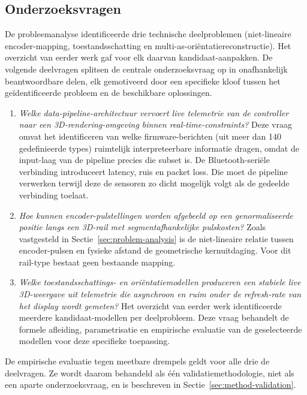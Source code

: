 \documentclass[10pt, a4paper, twocolumn]{article}
\begin{document}
\subsection{Onderzoeksvragen}
\label{sec:research-questions}
De probleemanalyse identificeerde drie technische deelproblemen (niet-lineaire
encoder-mapping, toestandsschatting en multi-as-oriëntatiereconstructie). Het
overzicht van eerder werk gaf voor elk daarvan kandidaat-aanpakken. De volgende deelvragen splitsen de centrale onderzoeksvraag op
in onafhankelijk beantwoordbare delen, elk gemotiveerd door een specifieke
kloof tussen het geïdentificeerde probleem en de beschikbare oplossingen.

\begin{enumerate}[leftmargin=*]
  \item \textit{Welke data-pipeline-architectuur vervoert live telemetrie van
    de controller naar een 3D-rendering-omgeving binnen real-time-constraints?}
    Deze vraag omvat het identificeren van welke firmware-berichten
    (uit meer dan 140 gedefinieerde types) ruimtelijk interpreteerbare
    informatie dragen, omdat de input-laag van de pipeline precies die subset
    is. De Bluetooth-seriële verbinding introduceert latency, ruis en packet
    loss. Die moet de pipeline verwerken terwijl deze de sensoren zo dicht
    mogelijk volgt als de gedeelde verbinding toelaat.
    \label{q:pipeline}
  \item \textit{Hoe kunnen encoder-pulstellingen worden afgebeeld op een
    genormaliseerde positie langs een 3D-rail met segmentafhankelijke
    pulskosten?}
    Zoals vastgesteld in Sectie~\ref{sec:problem-analysis} is de niet-lineaire
    relatie tussen encoder-pulsen en fysieke afstand de geometrische
    kernuitdaging. Voor dit rail-type bestaat geen bestaande mapping.
    \label{q:encoder}
  \item \textit{Welke toestandsschattings- en oriëntatiemodellen produceren een
    stabiele live 3D-weergave uit telemetrie die asynchroon en ruim onder de
    refresh-rate van het display wordt gemeten?}
    Het overzicht van eerder werk identificeerde meerdere kandidaat-modellen per
    deelprobleem. Deze vraag behandelt de formele afleiding, parametrisatie en
    empirische evaluatie van de geselecteerde modellen voor deze specifieke
    toepassing.
    \label{q:math}
\end{enumerate}

De empirische evaluatie tegen meetbare drempels geldt voor alle drie de
deelvragen. Ze wordt daarom behandeld als één validatiemethodologie, niet als
een aparte onderzoeksvraag, en is beschreven in
Sectie~\ref{sec:method-validation}.
\end{document}
